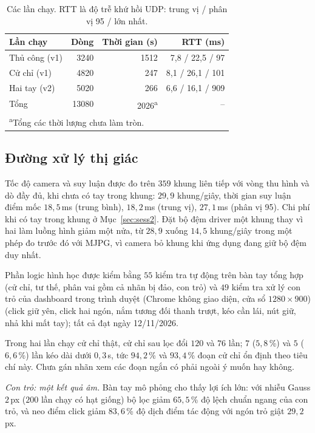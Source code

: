 \documentclass[5p,twocolumn]{elsarticle}
\begin{document}
\begin{table}[!t]
\caption{Các lần chạy. RTT là độ trễ khứ hồi UDP: trung vị / phân vị 95 / lớn nhất.}
\label{tab:data}
\centering
\small
\begin{tabular}{lrrr}
\toprule
Lần chạy & Dòng & Thời gian (s) & RTT (ms) \\
\midrule
Thủ công (v1)  & 3240 & 1512 & 7,8 / 22,5 / 97 \\
Cử chỉ (v1)    & 4820 &  247 & 8,1 / 26,1 / 101 \\
Hai tay (v2)   & 5020 &  266 & 6,6 / 16,1 / 909 \\
\midrule
Tổng & 13080 & 2026\textsuperscript{a} & -- \\
\bottomrule
\multicolumn{4}{l}{\footnotesize\textsuperscript{a}Tổng các thời lượng chưa làm tròn.}
\end{tabular}
\end{table}

\subsection{Đường xử lý thị giác}\label{sec:vision}
Tốc độ camera và suy luận được đo trên $359$ khung liên tiếp với vòng thu hình và dò đầy đủ, khi chưa có tay trong khung: $29{,}9$ khung/giây, thời gian suy luận điểm mốc $18{,}5$\,ms (trung bình), $18{,}2$\,ms (trung vị), $27{,}1$\,ms (phân vị 95). Chi phí khi có tay trong khung ở Mục~\ref{sec:sess2}. Đặt bộ đệm driver một khung thay vì hai làm luồng hình giảm một nửa, từ $28{,}9$ xuống $14{,}5$ khung/giây trong một phép đo trước đó với MJPG, vì camera bỏ khung khi ứng dụng đang giữ bộ đệm duy nhất.

Phần logic hình học được kiểm bằng $55$ kiểm tra tự động trên bàn tay tổng hợp (cử chỉ, tư thế, phân vai gồm cả nhãn bị đảo, con trỏ) và $49$ kiểm tra xử lý con trỏ của dashboard trong trình duyệt (Chrome không giao diện, cửa sổ $1280\times900$) (click giữ yên, click hai ngón, nắm tương đối thanh trượt, kéo cần lái, nút giữ, nhả khi mất tay); tất cả đạt ngày 12/11/2026.

Trong hai lần chạy cử chỉ thật, cử chỉ sau lọc đổi $120$ và $76$ lần; $7$ ($5{,}8$\,\%) và $5$ ($6{,}6$\,\%) lần kéo dài dưới $0{,}3$\,s, tức $94{,}2$\,\% và $93{,}4$\,\% đoạn cử chỉ ổn định theo tiêu chí này. Chưa gán nhãn xem các đoạn ngắn có phải ngoài ý muốn hay không.

\emph{Con trỏ: một kết quả âm.} Bàn tay mô phỏng cho thấy lợi ích lớn: với nhiễu Gauss $2$\,px ($200$ lần chạy có hạt giống) bộ lọc giảm $65{,}5$\,\% độ lệch chuẩn ngang của con trỏ, và neo điểm click giảm $83{,}6$\,\% độ dịch điểm tác động với ngón trỏ giật $29{,}2$\,px.
\end{document}
